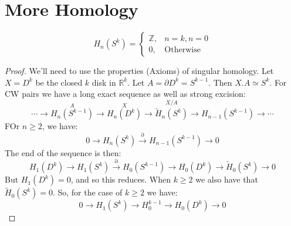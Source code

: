 \documentclass[crop=false,class=book,oneside]{standalone}
\begin{document}
    \section{More Homology}
        \begin{theorem}
            \begin{equation}
                H_{n}(S^{k})=
                \begin{cases}
                    \mathbb{Z},&n=k,n=0\\
                    0,&\textrm{Otherwise}
                \end{cases}
            \end{equation}
        \end{theorem}
        \begin{proof}
            We'll need to use the properties (Axioms) of singular
            homology. Let $X=D^{k}$ be the closed $k$ disk in
            $\mathbb{R}^{k}$. Let $A=\partial{D}^{k}=S^{k-1}$. Then
            $X.A\simeq{S}^{k}$. For CW pairs we have a long exact sequence
            as well as strong excision:
            \begin{equation}
                \cdots\longrightarrow
                \overset{A}{H_{n}(S^{k-1})}\longrightarrow
                \overset{X}{H_{n}(D^{k})}\longrightarrow
                \overset{X/A}{\tilde{H}_{n}(S^{k})}\longrightarrow
                H_{n-1}(S^{k-1})\longrightarrow\cdots
            \end{equation}
            FOr $n\geq{2}$, we have:
            \begin{equation}
                0\longrightarrow{H}_{n}(S^{k})
                \overset{\partial}{\longrightarrow}H_{n-1}(S^{k-1})
                \longrightarrow{0}
            \end{equation}
            The end of the sequence is then:
            \begin{equation}
                H_{1}(D^{k})\longrightarrow
                H_{1}(S^{k})\overset{\partial}{\longrightarrow}
                H_{0}(S^{k-1})\longrightarrow{H}_{0}(D^{k})
                \longrightarrow\tilde{H}_{0}(S^{k})\longrightarrow{0}
            \end{equation}
            But $H_{1}(D^{k})=0$, and so this reduces. When $k\geq{2}$
            we also have that $\tilde{H}_{0}(S^{k})=0$. So, for the case
            of $k\geq{2}$ we have:
            \begin{equation}
                0\longrightarrow{H}_{1}(S^{k})\longrightarrow
                H_{0}^{k-1}\longrightarrow{H}_{0}(D^{k})\longrightarrow{0}

\end{equation}
\end{proof}
\end{document}
